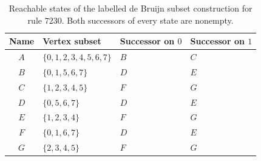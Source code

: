 \begin{table}[ht]
  \centering
  \small
  \setlength{\tabcolsep}{5pt}
  \renewcommand{\arraystretch}{1.08}
  \caption{Reachable states of the labelled de Bruijn subset construction for
  rule $7230$.  Both successors of every state are nonempty.}
  \label{tab:subset-certificate}
  \begin{tabular}{@{}clll@{}}
    \toprule
    Name & Vertex subset & Successor on $0$ & Successor on $1$ \\
    \midrule
    $A$ & $\{0,1,2,3,4,5,6,7\}$ & $B$ & $C$ \\
    $B$ & $\{0,1,5,6,7\}$       & $D$ & $E$ \\
    $C$ & $\{1,2,3,4,5\}$       & $F$ & $G$ \\
    $D$ & $\{0,5,6,7\}$         & $D$ & $E$ \\
    $E$ & $\{1,2,3,4\}$         & $F$ & $G$ \\
    $F$ & $\{0,1,6,7\}$         & $D$ & $E$ \\
    $G$ & $\{2,3,4,5\}$         & $F$ & $G$ \\
    \bottomrule
  \end{tabular}
\end{table}

